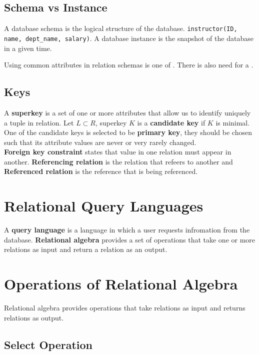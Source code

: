 \documentclass[11pt,a4paper,twocolumn]{book}
\begin{document}
\subsection{Schema vs Instance}

A database schema is the logical structure of the database. \texttt{instructor(ID, name, dept\_name, salary)}. A database instance is the snapshot of the database in a given time.

Using common attributes in relation schemas is one of \missing. There is also need for a \missing.

\subsection{Keys}

A \textbf{superkey} is a set of one or more attributes that allow us to identify uniquely a tuple in relation. Let $L \subset R$, superkey  $K$ is a \textbf{candidate key} if $K$ is minimal. One of the candidate keys is selected to be \textbf{primary key}, they should be chosen such that its attribute values are never or very rarely changed.\\

\textbf{Foreign key constraint} states that value in one relation must appear in another. \textbf{Referencing relation} is the relation that refeers to another and \textbf{Referenced relation} is the reference that is being referenced.

\section{Relational Query Languages}

A \textbf{query language} is a language in which a user requests infromation from the database. \textbf{Relational algebra} provides a set of operations that take one or more relations as input and return a relation as an output.

\section{Operations of Relational Algebra}

Relational algebra provides operations that take relations as input and returns relations as output.

\subsection{Select Operation}
\end{document}
